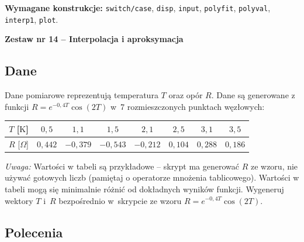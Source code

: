 \documentclass[a4paper,11pt]{article}
\begin{document}
\vspace{0.3cm}
\begin{ramka}
\textbf{Wymagane konstrukcje:}
\texttt{switch/case}, \texttt{disp}, \texttt{input}, \texttt{polyfit}, \texttt{polyval}, \texttt{interp1}, \texttt{plot}.
\end{ramka}

\clearpage
\begin{center}
  {\large\bfseries Zestaw nr 14 \quad -- \quad Interpolacja i aproksymacja}
\end{center}
\hrulefill
\vspace{0.4cm}

\subsection*{Dane}

Dane pomiarowe reprezentują temperatura $T$ oraz opór $R$.
Dane są generowane z funkcji $R = e^{-0{,}4T}\cos(2T)$ w~7 rozmieszczonych punktach węzłowych:

\begin{center}
\begin{tabular}{c|ccccccc}
  \toprule
  $T$ [$\text{K}$] & $0{,}5$ & $1{,}1$ & $1{,}5$ & $2{,}1$ & $2{,}5$ & $3{,}1$ & $3{,}5$ \\
  \midrule
  $R$ [$\Omega$] & $0{,}442$ & $-0{,}379$ & $-0{,}543$ & $-0{,}212$ & $0{,}104$ & $0{,}288$ & $0{,}186$ \\
  \bottomrule
\end{tabular}
\end{center}

\medskip
\textit{Uwaga:} Wartości w tabeli są przykładowe – skrypt ma generować $R$ ze wzoru, nie używać gotowych liczb (pamiętaj o operatorze mnożenia tablicowego). Wartości w tabeli mogą się minimalnie różnić od dokładnych wyników funkcji.
Wygeneruj wektory $T$ i~$R$ bezpośrednio w~skrypcie ze wzoru $R = e^{-0{,}4T}\cos(2T)$.

\subsection*{Polecenia}
\end{document}
